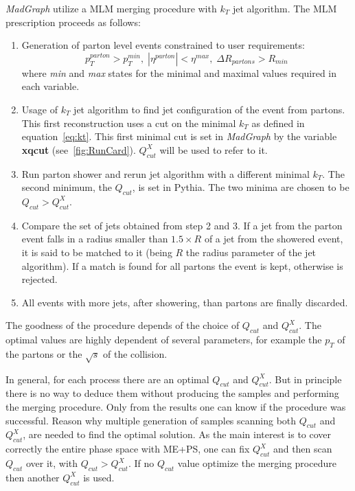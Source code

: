 \textit{MadGraph} utilize a MLM merging procedure with $k_{T}$ jet algorithm. The MLM prescription proceeds as follows:
\begin{enumerate}
\item Generation of parton level events constrained to user requirements:
  \begin{equation*}
    p_{T}^{parton}>p_{T}^{min}, \; |\eta^{parton}|<\eta^{max}, \; \Delta R_{partons}>R_{min}
  \end{equation*} where \textit{min} and \textit{max} states for the minimal and maximal values required in each variable.
\item Usage of $k_{T}$ jet algorithm to find jet configuration of the event from partons. This first reconstruction uses a cut on the minimal $k_{T}$ as defined in equation~\ref{eq:kt}. This first minimal cut is set in \textit{MadGraph} by the variable \textbf{xqcut} (see~\ref{fig:RunCard}). $Q^{X}_{cut}$ will be used to refer to it.
\item Run parton shower and rerun jet algorithm with a different minimal $k_{T}$. The second minimum, the $Q_{cut}$, is set in Pythia. The two minima are chosen to be $Q_{cut}>Q^{X}_{cut}$.
\item Compare the set of jets obtained from step 2 and 3. If a jet from the parton event falls in a radius smaller than $1.5 \times R$ of a jet from the showered event, it is said to be matched to it (being $R$ the radius parameter of the jet algorithm). If a match is found for all partons the event is kept, otherwise is rejected.
\item All events with more jets, after showering, than partons are finally discarded.   
\end{enumerate}

The goodness of the procedure depends of the choice of $Q_{cut}$ and $Q^{X}_{cut}$. The optimal values are highly dependent of several parameters, for example the $p_{T}$ of the partons or the $\sqrt{s}$ of the collision. 

In general, for each process there are an optimal $Q_{cut}$ and $Q^{X}_{cut}$. But in principle there is no way to deduce them without producing the samples and performing the merging procedure. Only from the results one can know if the procedure was successful. Reason why multiple generation of samples scanning both $Q_{cut}$ and $Q^{X}_{cut}$, are needed to find the optimal solution. As the main interest is to cover correctly the entire phase space with ME+PS, one can fix $Q^{X}_{cut}$ and then scan $Q_{cut}$ over it, with $Q_{cut}>Q^{X}_{cut}$. If no $Q_{cut}$ value optimize the merging procedure then another $Q^{X}_{cut}$ is used. 

